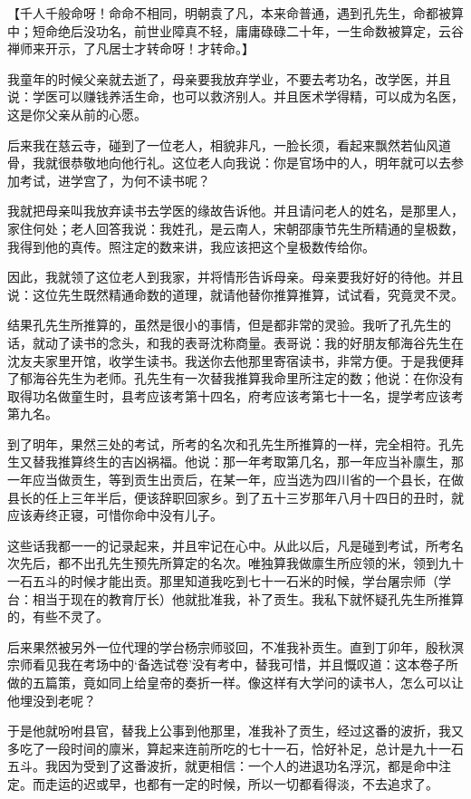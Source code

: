 \documentclass[12pt,twoside,openany]{book}
\newcommand{\kai}[1]{{\CJKfamily{kai}#1}}
\begin{document}
【\kai{千人千般命呀！命命不相同，明朝袁了凡，本来命普通，遇到孔先生，命都被算中；短命绝后没功名，前世业障真不轻，庸庸碌碌二十年，一生命数被算定，云谷禅师来开示，了凡居士才转命呀！才转命。}】

我童年的时候父亲就去逝了，母亲要我放弃学业，不要去考功名，改学医，并且说：学医可以赚钱养活生命，也可以救济别人。并且医术学得精，可以成为名医，这是你父亲从前的心愿。

后来我在慈云寺，碰到了一位老人，相貌非凡，一脸长须，看起来飘然若仙风道骨，我就很恭敬地向他行礼。这位老人向我说：你是官场中的人，明年就可以去参加考试，进学宫了，为何不读书呢？

我就把母亲叫我放弃读书去学医的缘故告诉他。并且请问老人的姓名，是那里人，家住何处；老人回答我说：我姓孔，是云南人，宋朝邵康节先生所精通的皇极数，我得到他的真传。照注定的数来讲，我应该把这个皇极数传给你。

因此，我就领了这位老人到我家，并将情形告诉母亲。母亲要我好好的待他。并且说：这位先生既然精通命数的道理，就请他替你推算推算，试试看，究竟灵不灵。

结果孔先生所推算的，虽然是很小的事情，但是都非常的灵验。我听了孔先生的话，就动了读书的念头，和我的表哥沈称商量。表哥说：我的好朋友郁海谷先生在沈友夫家里开馆，收学生读书。我送你去他那里寄宿读书，非常方便。于是我便拜了郁海谷先生为老师。孔先生有一次替我推算我命里所注定的数；他说：在你没有取得功名做童生时，县考应该考第十四名，府考应该考第七十一名，提学考应该考第九名。

到了明年，果然三处的考试，所考的名次和孔先生所推算的一样，完全相符。孔先生又替我推算终生的吉凶祸福。他说：那一年考取第几名，那一年应当补廪生，那一年应当做贡生，等到贡生出贡后，在某一年，应当选为四川省的一个县长，在做县长的任上三年半后，便该辞职回家乡。到了五十三岁那年八月十四日的丑时，就应该寿终正寝，可惜你命中没有儿子。

这些话我都一一的记录起来，并且牢记在心中。从此以后，凡是碰到考试，所考名次先后，都不出孔先生预先所算定的名次。唯独算我做廪生所应领的米，领到九十一石五斗的时候才能出贡。那里知道我吃到七十一石米的时候，学台屠宗师（学台：相当于现在的教育厅长）他就批准我，补了贡生。我私下就怀疑孔先生所推算的，有些不灵了。

后来果然被另外一位代理的学台杨宗师驳回，不准我补贡生。直到丁卯年，殷秋溟宗师看见我在考场中的‘备选试卷’没有考中，替我可惜，并且慨叹道：这本卷子所做的五篇策，竟如同上给皇帝的奏折一样。像这样有大学问的读书人，怎么可以让他埋没到老呢？

于是他就吩咐县官，替我上公事到他那里，准我补了贡生，经过这番的波折，我又多吃了一段时间的廪米，算起来连前所吃的七十一石，恰好补足，总计是九十一石五斗。我因为受到了这番波折，就更相信：一个人的进退功名浮沉，都是命中注定。而走运的迟或早，也都有一定的时候，所以一切都看得淡，不去追求了。
\end{document}
